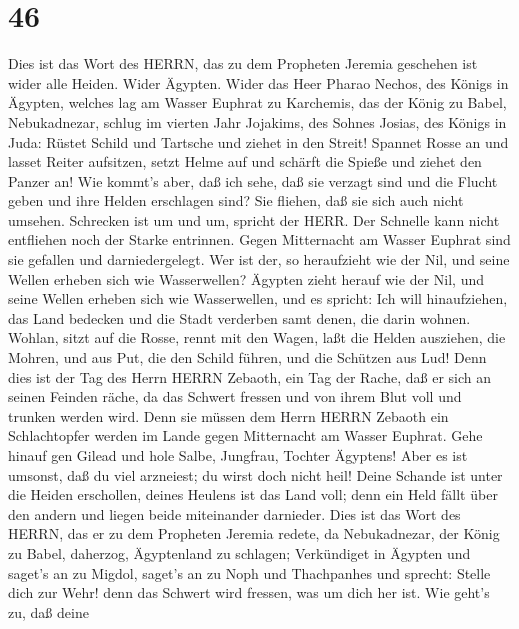 \hypertarget{section-45}{%
\section{46}\label{section-45}}

 Dies ist das Wort des HERRN, das zu dem Propheten Jeremia
geschehen ist wider alle Heiden.  Wider Ägypten. Wider das
Heer Pharao Nechos, des Königs in Ägypten, welches lag am Wasser Euphrat
zu Karchemis, das der König zu Babel, Nebukadnezar, schlug im vierten
Jahr Jojakims, des Sohnes Josias, des Königs in Juda: 
Rüstet Schild und Tartsche und ziehet in den Streit! 
Spannet Rosse an und lasset Reiter aufsitzen, setzt Helme auf und
schärft die Spieße und ziehet den Panzer an!  Wie kommt's
aber, daß ich sehe, daß sie verzagt sind und die Flucht geben und ihre
Helden erschlagen sind? Sie fliehen, daß sie sich auch nicht umsehen.
Schrecken ist um und um, spricht der HERR.  Der Schnelle
kann nicht entfliehen noch der Starke entrinnen. Gegen Mitternacht am
Wasser Euphrat sind sie gefallen und darniedergelegt.  Wer
ist der, so heraufzieht wie der Nil, und seine Wellen erheben sich wie
Wasserwellen?  Ägypten zieht herauf wie der Nil, und seine
Wellen erheben sich wie Wasserwellen, und es spricht: Ich will
hinaufziehen, das Land bedecken und die Stadt verderben samt denen, die
darin wohnen.  Wohlan, sitzt auf die Rosse, rennt mit den
Wagen, laßt die Helden ausziehen, die Mohren, und aus Put, die den
Schild führen, und die Schützen aus Lud!  Denn dies ist der
Tag des Herrn HERRN Zebaoth, ein Tag der Rache, daß er sich an seinen
Feinden räche, da das Schwert fressen und von ihrem Blut voll und
trunken werden wird. Denn sie müssen dem Herrn HERRN Zebaoth ein
Schlachtopfer werden im Lande gegen Mitternacht am Wasser Euphrat.
 Gehe hinauf gen Gilead und hole Salbe, Jungfrau, Tochter
Ägyptens! Aber es ist umsonst, daß du viel arzneiest; du wirst doch
nicht heil!  Deine Schande ist unter die Heiden erschollen,
deines Heulens ist das Land voll; denn ein Held fällt über den andern
und liegen beide miteinander darnieder.  Dies ist das Wort
des HERRN, das er zu dem Propheten Jeremia redete, da Nebukadnezar, der
König zu Babel, daherzog, Ägyptenland zu schlagen; 
Verkündiget in Ägypten und saget's an zu Migdol, saget's an zu Noph und
Thachpanhes und sprecht: Stelle dich zur Wehr! denn das Schwert wird
fressen, was um dich her ist.  Wie geht's zu, daß deine
